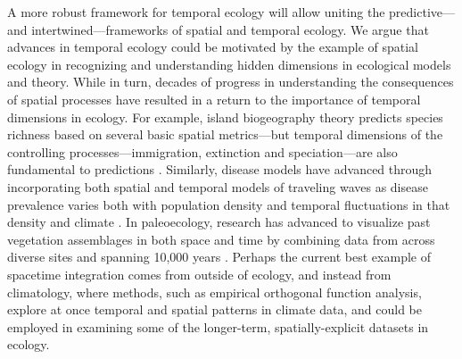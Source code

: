 \documentclass[11pt,a4paper,oneside]{article}
\begin{document}
\noindent A more robust framework for temporal ecology will allow uniting the predictive---and intertwined---frameworks of spatial and temporal ecology. We argue that advances in temporal ecology could be motivated by the example of spatial ecology in recognizing and understanding hidden dimensions in ecological models and theory. While in turn, decades of progress in understanding the consequences of spatial processes have resulted in a return to the importance of temporal dimensions in ecology. For example, island biogeography theory predicts species richness based on several basic spatial metrics---but temporal dimensions of the controlling processes---immigration, extinction and speciation---are also fundamental to predictions \citep{Wiens2011}. Similarly, disease models have advanced through incorporating both spatial and temporal models of traveling waves as disease prevalence varies both with population density and temporal fluctuations in that density \citep{Grenfell:2001ox} and climate \citep{lipp2002}. In paleoecology, research has advanced to visualize past vegetation assemblages in both space and time by combining data from across diverse sites and spanning 10,000 years \citep{Brewer2012}. Perhaps the current best example of spacetime integration comes from outside of ecology, and instead from climatology, where methods, such as empirical orthogonal function analysis, explore at once temporal and spatial patterns in climate data, and could be employed in examining some of the longer-term, spatially-explicit datasets in ecology.
\end{document}
